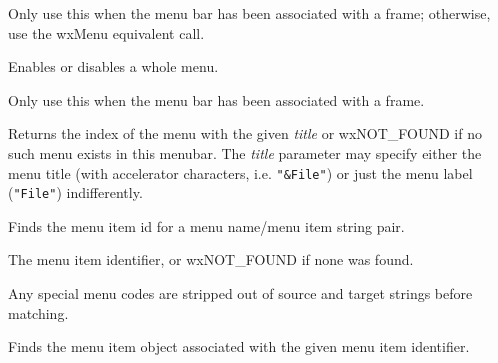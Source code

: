 Only use this when the menu bar has been
associated with a frame; otherwise, use the wxMenu equivalent call.

\label{wxmenubarenabletop}


Enables or disables a whole menu.





Only use this when the menu bar has been
associated with a frame.

\label{wxmenubarfindmenu}


Returns the index of the menu with the given {\it title} or wxNOT\_FOUND if no
such menu exists in this menubar. The {\it title} parameter may specify either
the menu title (with accelerator characters, i.e. {\tt "\&File"}) or just the
menu label ({\tt "File"}) indifferently.

\label{wxmenubarfindmenuitem}


Finds the menu item id for a menu name/menu item string pair.





The menu item identifier, or wxNOT\_FOUND if none was found.


Any special menu codes are stripped out of source and target strings
before matching.

\label{wxmenubarfinditem}


Finds the menu item object associated with the given menu item identifier.

